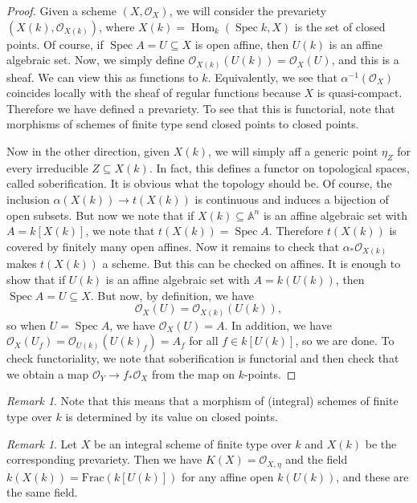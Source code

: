 \documentclass[leqno, openany]{memoir}
\theoremstyle{definition}
\theoremstyle{remark}
\newtheorem{rmk}[thm]{Remark}
\theoremstyle{plain}
\theoremstyle{definition}
\theoremstyle{remark}
\newcommand{\A}{\mathbb{A}}
\newcommand{\mc}[1]{\mathcal{#1}}
\newcommand{\mr}[1]{\mathrm{#1}}
\DeclareMathOperator{\Hom}{Hom}
\DeclareMathOperator{\Spec}{Spec}
\begin{document}
\begin{proof} Given a scheme $(X, \mc{O}_X)$, we will consider the prevariety
    $(X(k), \mc{O}_{X(k)})$, where $X(k) = \Hom_k(\Spec k, X)$ is the set of
    closed points. Of course, if $\Spec A = U \subseteq X$ is open affine, then
    $U(k)$ is an affine algebraic set. Now, we simply define $\mc{O}_{X(k)}
    (U(k)) = \mc{O}_X(U)$, and this is a sheaf. We can view this as functions
    to $k$. Equivalently, we see that $\alpha^{-1}(\mc{O}_X)$ coincides locally
    with the sheaf of regular functions because $X$ is quasi-compact. Therefore
    we have defined a prevariety. To see that this is functorial, note that
    morphisms of schemes of finite type send closed points to closed points.

    Now in the other direction, given $X(k)$, we will simply aff a generic
    point $\eta_Z$ for every irreducible $Z \subseteq X(k)$. In fact, this
    defines a functor on topological spaces, called soberification. It is
    obvious what the topology should be. Of course, the inclusion $\alpha(X(k))
    \to t(X(k))$ is continuous and induces a bijection of open subsets. But now
    we note that if $X(k) \subseteq \A^n$ is an affine algebraic set with $A =
    k[X(k)]$, we note that $t(X(k)) = \Spec A$. Therefore $t(X(k))$ is covered
    by finitely many open affines. Now it remains to check that $\alpha_*
    \mc{O}_{X(k)}$ makes $t(X(k))$ a scheme. But this can be checked on
    affines. It is enough to show that if $U(k)$ is an affine algebraic set
    with $A = k(U(k))$, then $\Spec A = U \subseteq X$. But now, by definition,
    we have \[ \mc{O}_X(U) = \mc{O}_{X(k)}(U(k)), \] so when $U = \Spec A$, we
    have $\mc{O}_X(U) = A$. In addition, we have $\mc{O}_X(U_f) =
    \mc{O}_{U(k)}({U(k)}_f) = A_f$ for all $f \in k[U(k)]$, so we are done. To
    check functoriality, we note that soberification is functorial and then
    check that we obtain a map $\mc{O}_Y \to f_* \mc{O}_X$ from the map on
    $k$-points.  \end{proof}

\begin{rmk} Note that this means that a morphism of (integral) schemes of
finite type over $k$ is determined by its value on closed points.  \end{rmk}

\begin{rmk} Let $X$ be an integral scheme of finite type over $k$ and $X(k)$ be
    the corresponding prevariety. Then we have $K(X) = \mc{O}_{X, \eta}$ and
    the field $k(X(k)) = \mr{Frac}(k[U(k)])$ for any affine open $k(U(k))$, and
    these are the same field.  \end{rmk}
\end{document}
